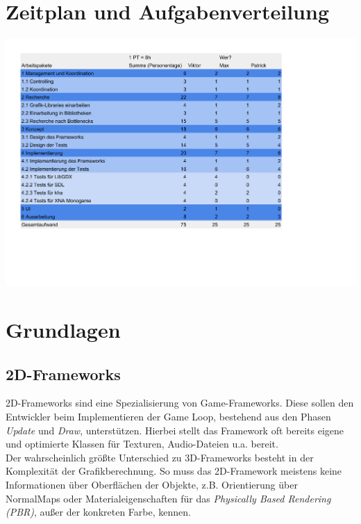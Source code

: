 \chapter{Zeitplan und Aufgabenverteilung}
\includegraphics[width=1.2\textwidth]{projektplan.pdf}


\chapter{Grundlagen}
\section{2D-Frameworks}
2D-Frameworks sind eine Spezialisierung von Game-Frameworks. Diese sollen den Entwickler beim Implementieren der Game Loop, bestehend aus den Phasen \emph{Update} und \emph{Draw}, unterstützen. Hierbei stellt das Framework oft bereits eigene und optimierte Klassen für Texturen, Audio-Dateien u.a. bereit.\\

Der wahrscheinlich größte Unterschied zu 3D-Frameworks besteht in der Komplexität der Grafikberechnung. So muss das 2D-Framework meistens keine Informationen über Oberflächen der Objekte, z.B. Orientierung über NormalMaps oder Materialeigenschaften für das \emph{Physically Based Rendering (PBR)}, außer der konkreten Farbe, kennen.

